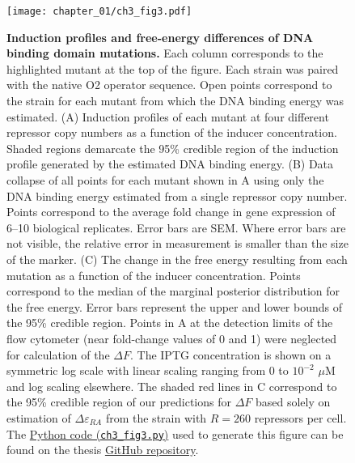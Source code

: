 \documentclass[12pt]{caltech_thesis}
\begin{document}
\hypertarget{fig:DNA_muts}{%
\begin{figure}
\centering
\texttt{[image: chapter\_01/ch3\_fig3.pdf]}
\caption[{Induction profiles and free-energy differences of DNA binding
domain mutations in the \emph{lac} repressor.}]{\textbf{Induction
profiles and free-energy differences of DNA binding domain mutations.}
Each column corresponds to the highlighted mutant at the top of the
figure. Each strain was paired with the native O2 operator sequence.
Open points correspond to the strain for each mutant from which the DNA
binding energy was estimated. (A) Induction profiles of each mutant at
four different repressor copy numbers as a function of the inducer
concentration. Shaded regions demarcate the 95\% credible region of the
induction profile generated by the estimated DNA binding energy. (B)
Data collapse of all points for each mutant shown in A using only the
DNA binding energy estimated from a single repressor copy number. Points
correspond to the average fold change in gene expression of 6--10
biological replicates. Error bars are SEM. Where error bars are not
visible, the relative error in measurement is smaller than the size of
the marker. (C) The change in the free energy resulting from each
mutation as a function of the inducer concentration. Points correspond
to the median of the marginal posterior distribution for the free
energy. Error bars represent the upper and lower bounds of the 95\%
credible region. Points in A at the detection limits of the flow
cytometer (near fold-change values of 0 and 1) were neglected for
calculation of the \(\Delta F\). The IPTG concentration is shown on a
symmetric log scale with linear scaling ranging from 0 to \(10^{-2}\)
\(\mu\)M and log scaling elsewhere. The shaded red lines in C correspond
to the 95\% credible region of our predictions for \(\Delta F\) based
solely on estimation of \(\Delta\varepsilon_{RA}\) from the strain with
\(R = 260\) repressors per cell. The
\href{https://github.com/gchure/phd/blob/master/src/chapter_03/code/ch3_fig3.py}{Python
code (\texttt{ch3\_fig3.py})} used to generate this figure can be found
on the thesis \href{https://github.com/gchure/phd}{GitHub repository}.}
\label{fig:DNA_muts}
\end{figure}
}
\end{document}
